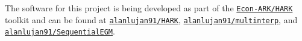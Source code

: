 \documentclass[SequentialEGM]{subfiles}
\begin{document}
The software for this project is being developed as part of the \href{https://github.com/econ-ark/HARK}{\texttt{Econ-ARK/HARK}} toolkit and can be found at \href{https://github.com/alanlujan91/HARK}{\texttt{alanlujan91/HARK}}, \href{https://github.com/alanlujan91/multinterp}{\texttt{alanlujan91/multinterp}},  and \href{https://gitfront.io/r/alanlujan91/DPFn3R7x3Avr/SequentialEGM/}{\texttt{alanlujan91/SequentialEGM}}.
\end{document}
